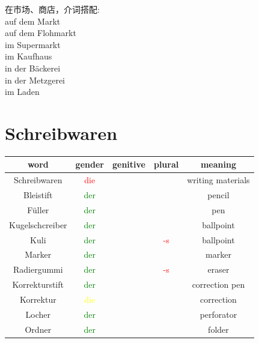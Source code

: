 \noindent
在市场、商店，介词搭配: \\
auf dem Markt \\
auf dem Flohmarkt \\
im Supermarkt \\
im Kaufhaus \\
in der Bäckerei \\
in der Metzgerei \\
im Laden \\

\section{Schreibwaren}
\begin{center}
    \begin{tabular} {|c|c|c|c|c|}
        \hline
        \rowcolor{gray}
        word            & gender                  & genitive & plural              & meaning           \\
        \hline
        Schreibwaren    & \textcolor{red}{die}    &          &                     & writing materials \\
        Bleistift       & \textcolor{green}{der}  &          &                     & pencil            \\
        Füller          & \textcolor{green}{der}  &          &                     & pen               \\
        Kugelschcreiber & \textcolor{green}{der}  &          &                     & ballpoint         \\
        Kuli            & \textcolor{green}{der}  &          & \textcolor{red}{-s} & ballpoint         \\
        Marker          & \textcolor{green}{der}  &          &                     & marker            \\
        Radiergummi     & \textcolor{green}{der}  &          & \textcolor{red}{-s} & eraser            \\
        Korrekturstift  & \textcolor{green}{der}  &          &                     & correction pen    \\
        Korrektur       & \textcolor{yellow}{die} &          &                     & correction        \\
        \hline
        Locher          & \textcolor{green}{der}  &          &                     & perforator        \\
        Ordner          & \textcolor{green}{der}  &          &                     & folder            \\

\end{tabular}
\end{center}

